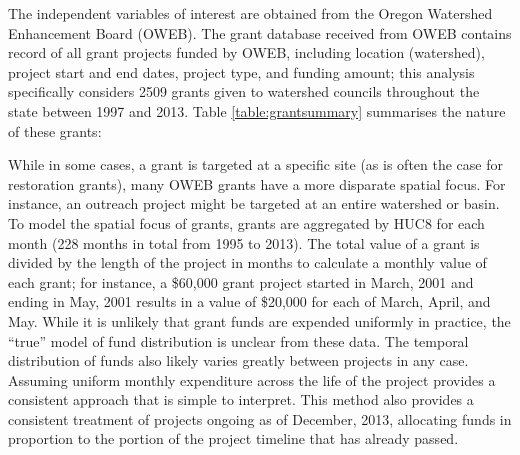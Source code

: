 \documentclass[11pt,a4paper,titlepage]{article}
\begin{document}
The independent variables of interest are obtained from the Oregon Watershed Enhancement Board (OWEB). The grant database received from OWEB contains record of all grant projects funded by OWEB, including location (watershed), project start and end dates, project type, and funding amount; this analysis specifically considers 2509 grants given to watershed councils throughout the state between 1997 and 2013. Table \ref{table:grantsummary} summarises the nature of these grants:



While in some cases, a grant is targeted at a specific site (as is often the case for restoration grants), many OWEB grants have a more disparate spatial focus. For instance, an outreach project might be targeted at an entire watershed or basin. To model the spatial focus of grants, grants are aggregated by HUC8 for each month (228 months in total from 1995 to 2013). The total value of a grant is divided by the length of the project in months to calculate a monthly value of each grant; for instance, a \$60,000 grant project started in March, 2001 and ending in May, 2001 results in a value of \$20,000 for each of March, April, and May. While it is unlikely that grant funds are expended uniformly in practice, the “true” model of fund distribution is unclear from these data. The temporal distribution of funds also likely varies greatly between projects in any case. Assuming uniform monthly expenditure across the life of the project provides a consistent approach that is simple to interpret. This method also provides a consistent treatment of projects ongoing as of December, 2013, allocating funds in proportion to the portion of the project timeline that has already passed. 
\end{document}
